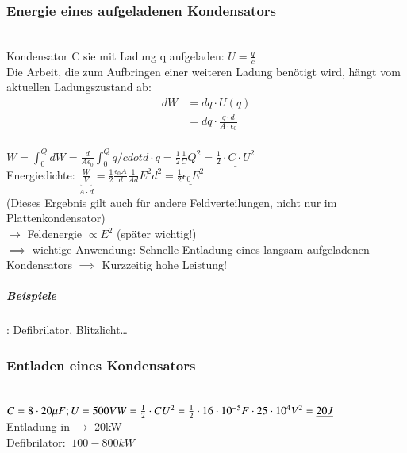 \documentclass[11pt]{article}
\begin{document}
\subsubsection{Energie eines aufgeladenen Kondensators}\\

Kondensator C sie mit Ladung q aufgeladen: $U=\frac{q}{c}$\\
Die Arbeit, die zum Aufbringen einer weiteren Ladung benötigt wird, hängt vom aktuellen Ladungszustand ab:\\

\begin{align*}
	dW&=dq\cdot U(q)\\
	&=dq\cdot\frac{q\cdot d}{A\cdot \epsilon_0}
\end{align*}\\

$W=\int_0^Q dW= \frac{d}{A\epsilon_0}\int_0^Q q/cdot d\cdot q= \frac{1}{2}\frac{1}{C}Q^2=\underline{\frac{1}{2}\cdot C\cdot U^2} $\\

Energiedichte: $ \underbrace{\frac{W}{V}}_{A\cdot d}=\frac{1}{2}\frac{\epsilon_0A}{d}\frac{1}{Ad}E^2d^2=\underline{\frac{1}{2}\epsilon_0E^2}$\\

(Dieses Ergebnis gilt auch für andere Feldverteilungen, nicht nur im Plattenkondensator)\\
$\rightarrow$ Feldenergie $\propto E^2$ (später wichtig!)\\

$\implies$ wichtige Anwendung: Schnelle Entladung eines langsam aufgeladenen Kondensators $\implies$ Kurzzeitig hohe Leistung!\\
\subparagraph{Beispiele}: Defibrilator, Blitzlicht…\\

\subsubsection{Entladen eines Kondensators}\\

$C=8\cdot 20\mu F; U=500V\\ W=\frac{1}{2}\cdot CU^2=\frac{1}{2}\cdot 16\cdot 10^{-5}F\cdot 25\cdot 10^4V^2\\ =\underline{20J}$\\
Entladung in  $\rightarrow$ \underline{20kW}\\

Defibrilator: $~ 100 - 800 kW$\\
\end{document}
